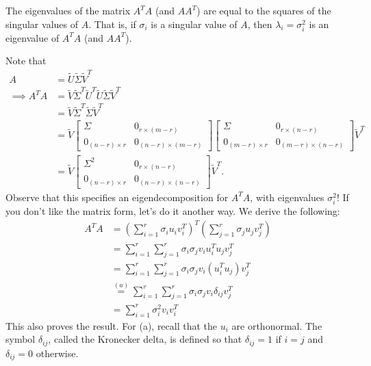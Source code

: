 \documentclass[12pt]{article}
\begin{document}
\begin{fact}
The eigenvalues of the matrix $A^T A$ (and $AA^T$) are equal to the squares of the singular values of $A$. That is, if $\sigma_i$ is a singular value of $A$, then $\lambda_i = \sigma_i^2$ is an eigenvalue of $A^T A$ (and $AA^T$). 
\end{fact}

Note that
%
\begin{align*}
A &= \tilde{U} \tilde{\Sigma} \tilde{V}^T \\
\implies A^T A &= \tilde{V} \tilde{\Sigma}^T \tilde{U}^T \tilde{U} \tilde{\Sigma} \tilde{V}^T\\
&= \tilde{V} \tilde{\Sigma}^T \tilde{\Sigma} \tilde{V}^T \\
&= \tilde{V} \left[\begin{matrix}\Sigma & 0_{r \times (m-r)} \\ 0_{(n-r)\times r} & 0_{(n-r)\times(m-r)} \end{matrix}\right] \left[\begin{matrix}\Sigma & 0_{r \times (n-r)} \\ 0_{(m-r)\times r} & 0_{(m-r)\times(n-r)} \end{matrix}\right] \tilde{V}^T \\
&= \tilde{V} \left[\begin{matrix}\Sigma^2 & 0_{r \times (n-r)} \\ 0_{(n-r)\times r} & 0_{(n-r)\times(n-r)} \end{matrix}\right] \tilde{V}^T.
\end{align*}
%
Observe that this specifies an eigendecomposition for $A^TA$, with eigenvalues $\sigma_i^2$! If you don't like the matrix form, let's do it another way. We derive the following:
%
\begin{align*}
A^T A &= \left(\sum_{i=1}^r \sigma_i u_i v_i^T\right)^T \left(\sum_{j=1}^r \sigma_j u_j v_j^T\right) \\
&= \sum_{i=1}^r \sum_{j=1}^r \sigma_i \sigma_j  v_i u_i^T  u_j v_j^T \\
&= \sum_{i=1}^r \sum_{j=1}^r \sigma_i \sigma_j  v_i (u_i^T  u_j) v_j^T \\
&\overset{(a)}{=} \sum_{i=1}^r \sum_{j=1}^r \sigma_i \sigma_j  v_i \delta_{ij} v_j^T \\
&= \sum_{i=1}^r \sigma_i^2 v_i v_i^T 
\end{align*}
%
This also proves the result. For (a), recall that the $u_i$ are orthonormal. The symbol $\delta_{ij}$, called the Kronecker delta, is defined so that $\delta_{ij} = 1$ if $i=j$ and $\delta_{ij} = 0$ otherwise. 
\end{document}
